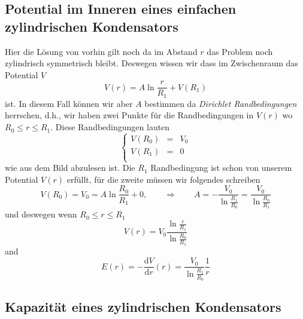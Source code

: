 \documentclass[A4paper, 12pt]{amsart}
\begin{document}
\subsection{Potential im Inneren eines einfachen zylindrischen Kondensators}

\begin{center}
  
\end{center}

Hier die Lösung von vorhin gilt noch da im Abstand
$ r $ das Problem noch zylindrisch symmetrisch bleibt.
Deswegen wissen wir dass im Zwischenraum das Potential $ V $
\begin{equation}
  V(r) =
  A \ln \frac{r}{R_{1}}
  +
  V(R_{1})
\end{equation}
ist.
In diesem Fall können wir aber $ A $ bestimmen da
\textit{Dirichlet Randbedingungen}
herrschen, d.h., wir haben zwei Punkte für die Randbedingungen in $ V(r) $
wo $ R_{0} \leq r \leq R_{1} $.
Diese Randbedingungen lauten
%
\begin{equation*}
  \left\{
    \begin{matrix}
      V(R_{0}) & = & V_{0} \\
      V(R_{1}) & = & 0 \\
    \end{matrix}
  \right.
\end{equation*}
%
wie aus dem Bild abzulesen ist.
Die $ R_{1} $ Randbedingung ist schon von unserem Potential $ V(r) $ erfüllt,
für die zweite müssen wir folgendes schreiben
%
\begin{equation*}
  V(R_{0}) = V_{0} =
  A \ln \frac{R_{0}}{R_{1}}
  +
  0,
  \qquad \Rightarrow \qquad
  A =
  -
  \frac{V_{0}}{\ln \frac{R_{1}}{R_{0}}}
  =
  \frac{V_{0}}{\ln \frac{R_{0}}{R_{1}}}
\end{equation*}
%
und deswegen wenn $ R_{0} \leq r \leq R_{1} $
\begin{equation*}
  V(r) =
  V_{0}
  \frac{\ln \frac{r}{R_{1}}}{\ln \frac{R_{0}}{R_{1}}}
\end{equation*}
and
\begin{equation*}
  E(r) =
  - \frac{\mathrm{d}V}{\mathrm{d}r}(r)
  =
  \frac{V_{0}}{\ln \frac{R_{1}}{R_{0}}}
  \frac{1}{r}
\end{equation*}

\subsection{Kapazität eines zylindrischen Kondensators}
\end{document}
